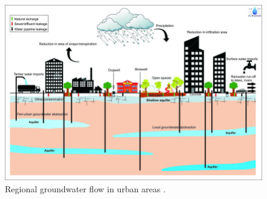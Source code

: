 \begin{figure}[htbp]
    \centering
    \includegraphics[width=0.95\linewidth]{figures/figures theory/urbanflow.png}
    \caption{Regional groundwater flow in urban areas \cite{siddique-2017}.}
    \label{gwflow}
\end{figure}
\\
